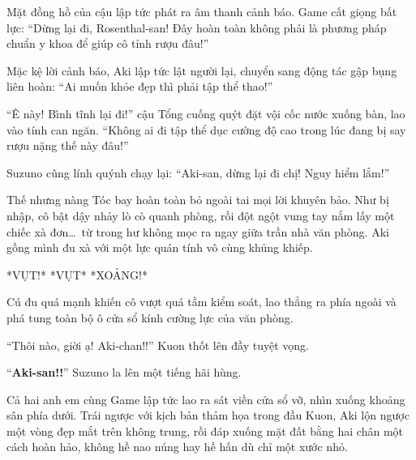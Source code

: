\documentclass[../main.tex]{subfiles}
\begin{document}
Mặt đồng hồ của cậu lập tức phát ra âm thanh cảnh báo. Game cất giọng bất lực: ``Dừng lại đi, Rosenthal-san! Đây hoàn toàn không phải là phương pháp chuẩn y khoa để giúp cô tỉnh rượu đâu!''

Mặc kệ lời cảnh báo, Aki lập tức lật người lại, chuyển sang động tác gập bụng liên hoàn: ``Ai muốn khỏe đẹp thì phải tập thể thao!''


``Ê này! Bình tĩnh lại đi!'' cậu Tổng cuống quýt đặt vội cốc nước xuống bàn, lao vào tính can ngăn. ``Không ai đi tập thể dục cường độ cao trong lúc đang bị say rượu nặng thế này đâu!''

Suzuno cũng lính quýnh chạy lại: ``Aki-san, dừng lại đi chị! Nguy hiểm lắm!''

Thế nhưng nàng Tóc bay hoàn toàn bỏ ngoài tai mọi lời khuyên bảo. Như bị nhập, cô bật dậy nhảy lò cò quanh phòng, rồi đột ngột vung tay nắm lấy một chiếc xà đơn\dots\ từ trong hư không mọc ra ngay giữa trần nhà văn phòng. Aki gồng mình đu xà với một lực quán tính vô cùng khủng khiếp.

\begin{figure}[H]
  \centering
  \begin{subfigure}[t]{0.45\textwidth}
    \centering
  \end{subfigure}
  \quad
  \begin{subfigure}[t]{0.45\textwidth}
    \centering
  \end{subfigure}
\end{figure}

*VỤT!* *VỤT* *XOẢNG!*

Cú đu quá mạnh khiến cô vượt quá tầm kiểm soát, lao thẳng ra phía ngoài và phá tung toàn bộ ô cửa sổ kính cường lực của văn phòng.

``Thôi nào, giời ạ! Aki-chan!!'' Kuon thốt lên đầy tuyệt vọng.

``\textbf{Aki-san!!}'' Suzuno la lên một tiếng hãi hùng.

Cả hai anh em cùng Game lập tức lao ra sát viền cửa sổ vỡ, nhìn xuống khoảng sân phía dưới. Trái ngược với kịch bản thảm họa trong đầu Kuon, Aki lộn ngược một vòng đẹp mắt trên không trung, rồi đáp xuống mặt đất bằng hai chân một cách hoàn hảo, không hề nao núng hay hề hấn dù chỉ một xước nhỏ.

\end{document}
